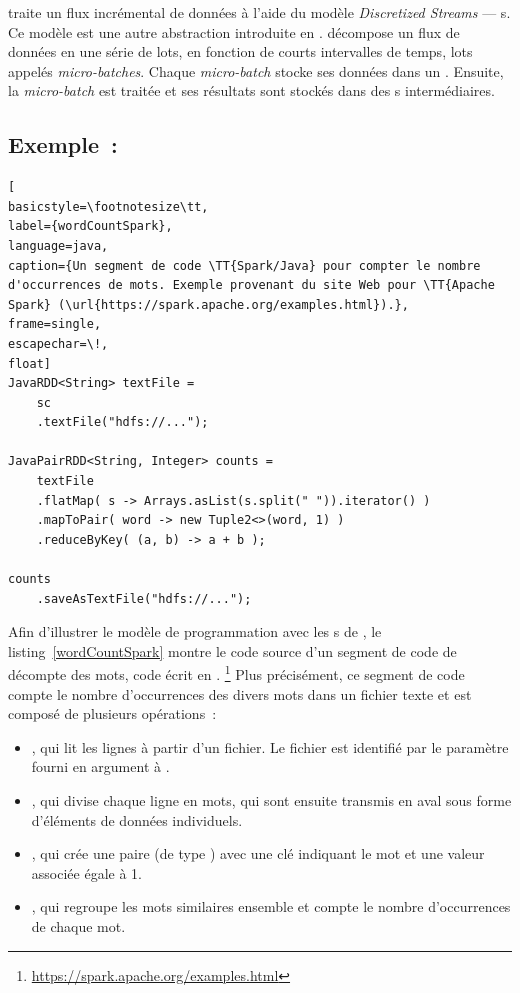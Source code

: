  traite un flux incr\'emental de donn\'ees \`a l'aide du mod\`ele \emph{Discretized Streams} --- s.   
%
Ce mod\`ele est une autre abstraction introduite en . 
 d\'ecompose un flux de donn\'ees en une s\'erie de lots, en fonction de courts intervalles de temps, lots appel\'es \emph{micro-batches}. Chaque \emph{micro-batch} stocke ses donn\'ees dans un . Ensuite, la \emph{micro-batch} est trait\'ee et ses r\'esultats sont stock\'es dans des s interm\'ediaires.


\subsection{Exemple~: }


\begin{lstlisting}[
basicstyle=\footnotesize\tt,
label={wordCountSpark},
language=java,
caption={Un segment de code \TT{Spark/Java} pour compter le nombre d'occurrences de mots. Exemple provenant du site Web pour \TT{Apache Spark} (\url{https://spark.apache.org/examples.html}).},
frame=single,
escapechar=\!,
float]
JavaRDD<String> textFile = 
    sc
    .textFile("hdfs://...");

JavaPairRDD<String, Integer> counts = 
    textFile
    .flatMap( s -> Arrays.asList(s.split(" ")).iterator() )
    .mapToPair( word -> new Tuple2<>(word, 1) )
    .reduceByKey( (a, b) -> a + b );

counts
    .saveAsTextFile("hdfs://...");
\end{lstlisting}


Afin d'illustrer le mod\`ele de programmation avec les s de , le listing~\ref{wordCountSpark} montre le code source d'un segment de code de d\'ecompte des mots, code \'ecrit en .%
%
\footnote{\url{https://spark.apache.org/examples.html}}
%
Plus pr\'ecis\'ement, ce segment de code compte le nombre d'occurrences des divers mots dans un fichier texte et est compos\'e de plusieurs op\'erations~: 
\begin{itemize}

\item {}, qui lit les lignes \`a partir d'un fichier. Le fichier est identifi\'e par le param\`etre fourni en argument \`a .

\item {}, qui divise chaque ligne en mots, qui sont ensuite transmis en aval sous forme d'\'el\'ements de donn\'ees individuels.

\item {}, qui cr\'ee une paire (de type ) avec une cl\'e indiquant le mot et une valeur associ\'ee \'egale \`a 1.

\item {}, qui regroupe les mots similaires ensemble et compte le nombre d'occurrences de chaque mot.


\end{itemize}



